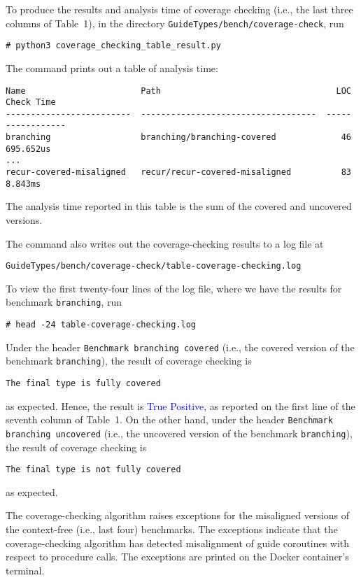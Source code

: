 To produce the results and analysis time of coverage checking (i.e., the last
three columns of Table~1), in the directory
\texttt{GuideTypes/bench/coverage-check}, run
\begin{verbatim}
# python3 coverage_checking_table_result.py
\end{verbatim}
%
The command prints out a table of analysis time:
\begin{verbatim}
Name                       Path                                   LOC  Check Time
-------------------------  -----------------------------------  -----  ------------
branching                  branching/branching-covered             46  695.652us
...
recur-covered-misaligned   recur/recur-covered-misaligned          83  8.843ms
\end{verbatim}
%
The analysis time reported in this table is the sum of the covered and
uncovered versions.

The command also writes out the coverage-checking results to a log file at
\begin{verbatim}
GuideTypes/bench/coverage-check/table-coverage-checking.log
\end{verbatim}
%
To view the first twenty-four lines of the log file, where we have the results
for benchmark \texttt{branching}, run
\begin{verbatim}
# head -24 table-coverage-checking.log
\end{verbatim}
%
Under the header \texttt{Benchmark branching covered} (i.e., the covered version
of the benchmark \texttt{branching}), the result of coverage checking is
\begin{verbatim}
The final type is fully covered
\end{verbatim}
as expected.
%
Hence, the result is \textcolor{blue}{True Positive}, as reported on the first
line of the seventh column of Table~1.
%
On the other hand, under the header \texttt{Benchmark branching uncovered}
(i.e., the uncovered version of the benchmark \texttt{branching}), the result of
coverage checking is
\begin{verbatim}
The final type is not fully covered
\end{verbatim}
as expected.

The coverage-checking algorithm raises exceptions for the misaligned versions of
the context-free (i.e., last four) benchmarks.
%
The exceptions indicate that the coverage-checking algorithm has detected
misalignment of guide coroutines with respect to procedure calls.
%
The exceptions are printed on the Docker container's terminal.

